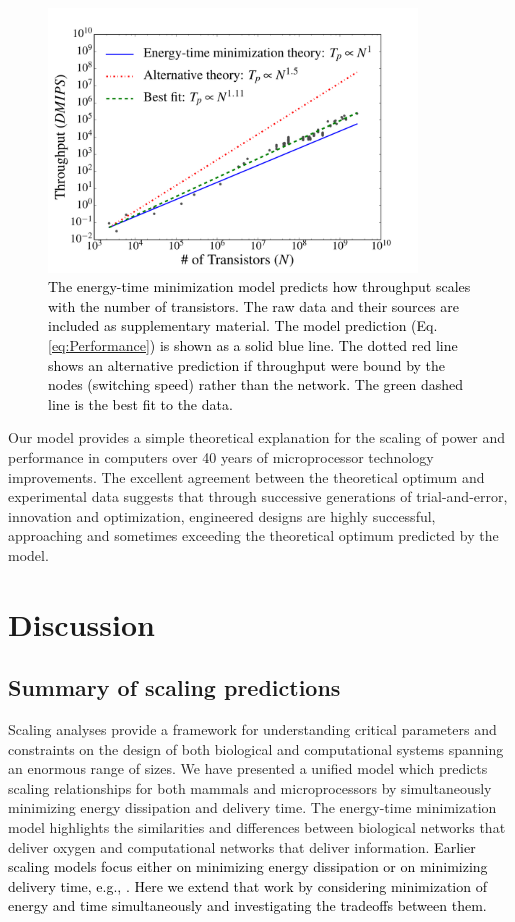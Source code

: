 \documentclass[12pt]{article}
\newcommand{\red}[1]{\textcolor{black}{#1}}
\begin{document}
\begin{figure}[!h]
\centering
\includegraphics[height=70mm]{Figures/ChipsThroughputScaling.pdf}
\caption{\red{The energy-time minimization model predicts how throughput
  scales with the number of transistors.  The raw data and their sources are included as
  supplementary material. The model
 prediction  (Eq. \ref{eq:Performance}) is shown as a solid blue
  line. The dotted red line shows an alternative prediction if throughput were 
  bound by the nodes (switching speed) rather than the network. The
  green dashed line is the best fit to the data.}}
\label{fig:throughput}
\end{figure}

Our model provides a simple theoretical explanation for the scaling of power
and performance in computers over 40 years of microprocessor technology
improvements.  The excellent agreement between the theoretical optimum and
experimental data suggests that through successive generations of
trial-and-error, innovation and optimization, engineered designs are highly
successful, approaching and sometimes exceeding the theoretical optimum predicted by the model.


\section{Discussion}
\label{sec:discussion}

\subsection{Summary of scaling predictions}
Scaling analyses provide a framework for understanding critical
parameters and constraints on the design of both biological and
computational systems spanning an enormous range of sizes.   We have
presented a unified model which predicts scaling relationships for both mammals and
microprocessors by simultaneously minimizing energy dissipation and delivery time. 
The energy-time minimization model highlights the similarities and
differences between biological networks that deliver oxygen and
computational networks that deliver information.  \red{Earlier scaling
models focus either on minimizing energy dissipation or on minimizing
delivery time, e.g., \cite{west97,banavar10}.  Here we extend that work by considering minimization of energy and time
simultaneously and investigating the tradeoffs between them.}
\end{document}
